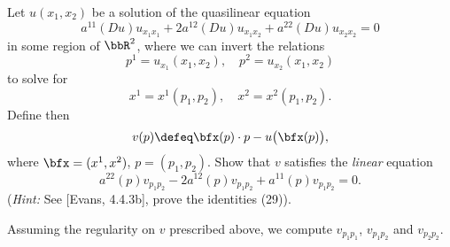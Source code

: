 \begin{problem}
  Let \(u(x_1,x_2)\) be a solution of the quasilinear equation
  \[
    a^{11}(Du)u_{x_1x_1}+ 2a^{12}(Du)u_{x_1x_2}+a^{22}(Du)u_{x_2x_2}=0
  \]
  in some region of \(\bbR^2\), where we can invert the relations
  \[
    p^1=u_{x_1}(x_1,x_2),\quad p^2=u_{x_2}(x_1,x_2)
  \]
  to solve for
  \[
    x^1=x^1(p_1,p_2),\quad x^2=x^2(p_1,p_2).
  \]
  Define then
  \[
    v(p)\defeq \bfx(p)\cdot p-u\bigl(\bfx(p)\bigr),
  \]
  where \(\bfx=(x^1,x^2)\), \(p=(p_1,p_2)\). Show that \(v\) satisfies the
  \emph{linear} equation
  \[
    a^{22}(p)v_{p_1p_2}-2a^{12}(p)v_{p_1p_2}+a^{11}(p)v_{p_1p_2}=0.
  \]
  (\emph{Hint:} See [Evans, 4.4.3b], prove the identities (29)).
\end{problem}
\begin{solution}
  Assuming the regularity on \(v\) prescribed above, we compute
  \(v_{p_1p_1}\), \(v_{p_1p_2}\) and \(v_{p_2p_2}\).


\end{solution}
